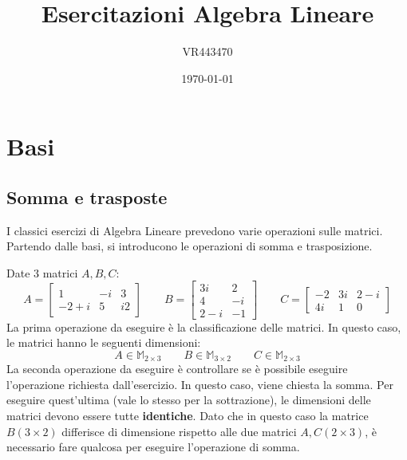 \documentclass[a4paper]{article}
\begin{document}
	\author{VR443470}
	\title{Esercitazioni Algebra Lineare}
	\date{\printdayoff\today}
	\maketitle
	
	\newpage
	
	\tableofcontents
	
	\newpage
	
	\section{Basi}
	
	\subsection{Somma e trasposte}
	
	I classici esercizi di Algebra Lineare prevedono varie operazioni sulle matrici. Partendo dalle basi, si introducono le operazioni di somma e trasposizione.\newline
	
	\noindent
	Date $3$ matrici $A, B, C$:
	\begin{equation*}
		A = \begin{bmatrix}
			   1 & -i & 3 \\
			-2+i &  5 & i2
		\end{bmatrix} \hspace{2em}
		B = \begin{bmatrix}
			3i	& 2		\\
			4	& -i 	\\
			2-i	& -1
		\end{bmatrix} \hspace{2em}
		C = \begin{bmatrix}
			-2	& 3i	& 2-i	\\
			4i	& 1		& 0
		\end{bmatrix}
	\end{equation*}
	La \textcolor{Red3}{prima operazione} da eseguire è la classificazione delle matrici. In questo caso, le matrici hanno le seguenti dimensioni:
	\begin{equation*}
		A\in\mathbb{M}_{2\times3} \hspace{2em} B\in\mathbb{M}_{3\times2} \hspace{2em} C\in\mathbb{M}_{2\times3}
	\end{equation*}
	La \textcolor{Red3}{seconda operazione} da eseguire è controllare se è possibile eseguire l'operazione richiesta dall'esercizio. In questo caso, viene chiesta la somma. Per eseguire quest'ultima (vale lo stesso per la sottrazione), le dimensioni delle matrici devono essere tutte \textbf{identiche}. Dato che in questo caso la matrice $B \left(3\times2\right)$ differisce di dimensione rispetto alle due matrici $A,C \left(2\times3\right)$, è necessario fare qualcosa per eseguire l'operazione di somma.\newline
	
\end{document}
